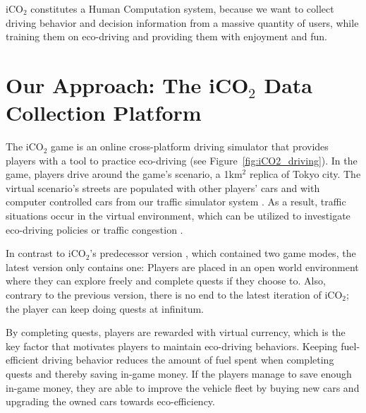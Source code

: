 \documentclass[preprint,authoryear,12pt]{elsarticle}
\begin{document}
iCO$_2$ constitutes a Human Computation system, because we want to collect driving behavior and decision information from a massive quantity of users, while training them on eco-driving and providing them with enjoyment and fun.


\section{Our Approach: The iCO$_2$ Data Collection Platform}\label{sec:platform}

The iCO$_2$ game is an online cross-platform driving simulator that provides players with a tool to practice eco-driving (see Figure~\ref{fig:iCO2_driving}). In the game, players drive around the game's scenario, a 1km$^2$ replica of Tokyo city. The virtual scenario's streets are populated with other players' cars and with computer controlled cars from our traffic simulator system \citep{Prendinger+others.2014}. As a result, traffic situations occur in the virtual environment, which can be utilized to investigate eco-driving policies \citep{Prendinger+others.2013} or traffic congestion \citep{Gajananan+others.2013}.

In contrast to iCO$_2$'s predecessor version \citep{prendingeroliveira2014}, which contained two game modes, the latest version only contains one: Players are placed in an open world environment where they can explore freely and complete quests if they choose to. Also, contrary to the previous version, there is no end to the latest iteration of iCO$_2$; the player can keep doing quests at infinitum.

By completing quests, players are rewarded with virtual currency, which is the key factor that motivates players to maintain eco-driving behaviors. Keeping fuel-efficient driving behavior reduces the amount of fuel spent when completing quests and thereby saving in-game money. If the players manage to save enough in-game money, they are able to improve the vehicle fleet by buying new cars and upgrading the owned cars towards eco-efficiency.
\end{document}
